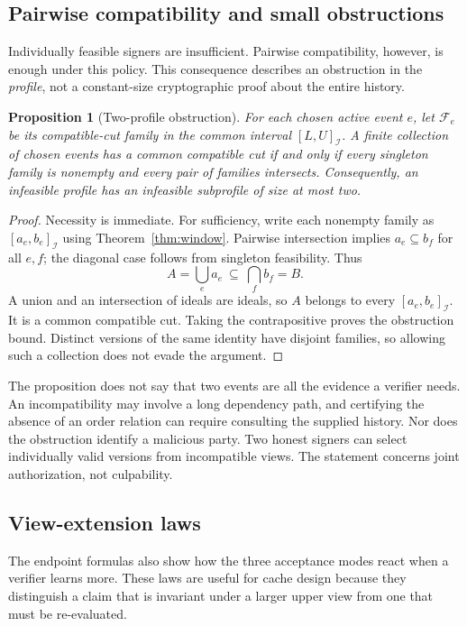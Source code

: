 \documentclass[11pt]{article}
\newtheorem{proposition}[theorem]{Proposition}
\theoremstyle{definition}
\newcommand{\Id}{\mathcal I}
\begin{document}
\subsection{Pairwise compatibility and small obstructions}
Individually feasible signers are insufficient. Pairwise compatibility, however, is enough under this policy. This consequence describes an obstruction in the \emph{profile}, not a constant-size cryptographic proof about the entire history.

\begin{proposition}[Two-profile obstruction]\label{prop:helly}
For each chosen active event $e$, let $\mathcal F_e$ be its compatible-cut family in the common interval $[L,U]_{\Id}$. A finite collection of chosen events has a common compatible cut if and only if every singleton family is nonempty and every pair of families intersects. Consequently, an infeasible profile has an infeasible subprofile of size at most two.
\end{proposition}
\begin{proof}
Necessity is immediate. For sufficiency, write each nonempty family as $[a_e,b_e]_{\Id}$ using Theorem~\ref{thm:window}. Pairwise intersection implies $a_e\subseteq b_f$ for all $e,f$; the diagonal case follows from singleton feasibility. Thus
\[
 A=\bigcup_e a_e\ \subseteq\ \bigcap_f b_f=B.
\]
A union and an intersection of ideals are ideals, so $A$ belongs to every $[a_e,b_e]_{\Id}$. It is a common compatible cut. Taking the contrapositive proves the obstruction bound. Distinct versions of the same identity have disjoint families, so allowing such a collection does not evade the argument.
\end{proof}

The proposition does not say that two events are all the evidence a verifier needs. An incompatibility may involve a long dependency path, and certifying the absence of an order relation can require consulting the supplied history. Nor does the obstruction identify a malicious party. Two honest signers can select individually valid versions from incompatible views. The statement concerns joint authorization, not culpability.


\subsection{View-extension laws}
The endpoint formulas also show how the three acceptance modes react when a verifier learns more.  These laws are useful for cache design because they distinguish a claim that is invariant under a larger upper view from one that must be re-evaluated.
\end{document}
